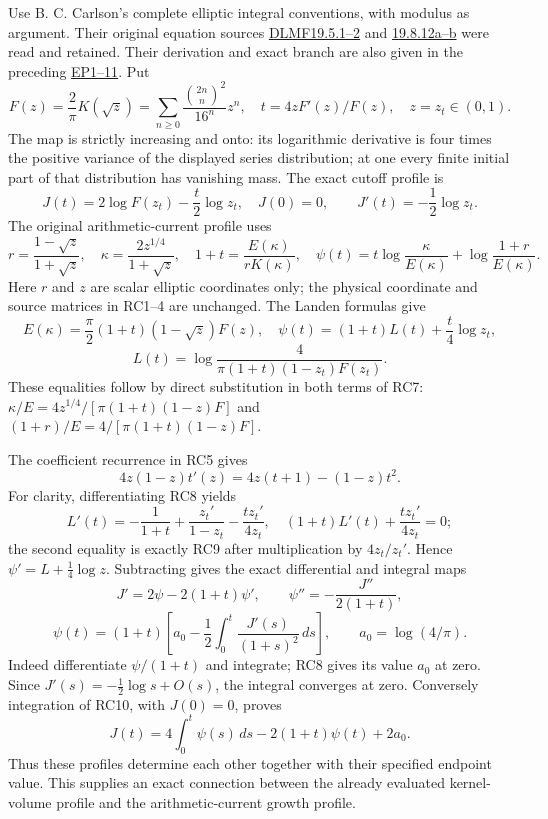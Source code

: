 \documentclass[10pt]{article}
\begin{document}
Use B. C. Carlson's complete elliptic integral conventions, with modulus as argument. Their original equation sources \href{https://dlmf.nist.gov/19.5}{DLMF19.5.1--2} and \href{https://dlmf.nist.gov/19.8.E12}{19.8.12a--b} were read and retained. Their derivation and exact branch are also given in the preceding \href{https://github.com/KokunoYumeto/zeta-function-research-reader/blob/6cf5b3aa8ff395eba6b5512b28d117334da5767b/workbenches/splitzero-tandem/continuations/20260922-cutoff-profile/ELLIPTIC_PROFILE_PROOF.md\#L5}{EP1--11}. Put \[
F(z)=\frac2\pi K(\sqrt z)=\sum_{n\ge0}\frac{\binom{2n}{n}^2}{16^n}z^n,
\quad t=4zF'(z)/F(z),\quad z=z_t\in(0,1).
\tag{RC5}
\] The map is strictly increasing and onto: its logarithmic derivative is four times the positive variance of the displayed series distribution; at one every finite initial part of that distribution has vanishing mass. The exact cutoff profile is \[
J(t)=2\log F(z_t)-\frac t2\log z_t,\quad J(0)=0,
\qquad J'(t)=-\frac12\log z_t.
\tag{RC6}
\] The original arithmetic-current profile uses \[
r=\frac{1-\sqrt z}{1+\sqrt z},\quad
\kappa=\frac{2z^{1/4}}{1+\sqrt z},\quad
1+t=\frac{E(\kappa)}{rK(\kappa)},\quad
\psi(t)=t\log\frac{\kappa}{E(\kappa)}+
\log\frac{1+r}{E(\kappa)}.
\tag{RC7}
\] Here \(r\) and \(z\) are scalar elliptic coordinates only; the physical coordinate and source matrices in RC1--4 are unchanged. The Landen formulas give \[
E(\kappa)=\frac\pi2(1+t)(1-\sqrt z)F(z),
\quad
\psi(t)=(1+t)L(t)+\frac t4\log z_t,
\] \[
L(t)=\log\frac4{\pi(1+t)(1-z_t)F(z_t)}.
\tag{RC8}
\] These equalities follow by direct substitution in both terms of RC7: \(\kappa/E=4z^{1/4}/[\pi(1+t)(1-z)F]\) and \((1+r)/E=4/[\pi(1+t)(1-z)F]\).

The coefficient recurrence in RC5 gives \[
4z(1-z)t'(z)=4z(t+1)-(1-z)t^2.
\tag{RC9}
\] For clarity, differentiating RC8 yields \[
L'(t)=-\frac1{1+t}+\frac{z_t'}{1-z_t}
-\frac{t z_t'}{4z_t},
\quad (1+t)L'(t)+\frac{t z_t'}{4z_t}=0;
\] the second equality is exactly RC9 after multiplication by \(4z_t/z_t'\). Hence \(\psi'=L+\tfrac14\log z\). Subtracting gives the exact differential and integral maps \[
\boxed{J'=2\psi-2(1+t)\psi',\qquad
\psi''=-\frac{J''}{2(1+t)},}
\tag{RC10}
\] \[
\boxed{\psi(t)=(1+t)\left[
a_0-\frac12\int_0^t\frac{J'(s)}{(1+s)^2}\,ds\right],
\qquad a_0=\log(4/\pi).}
\tag{RC11}
\] Indeed differentiate \(\psi/(1+t)\) and integrate; RC8 gives its value \(a_0\) at zero. Since \(J'(s)=-\tfrac12\log s+O(s)\), the integral converges at zero. Conversely integration of RC10, with \(J(0)=0\), proves \[
J(t)=4\int_0^t\psi(s)\,ds-2(1+t)\psi(t)+2a_0.
\tag{RC12}
\] Thus these profiles determine each other together with their specified endpoint value. This supplies an exact connection between the already evaluated kernel-volume profile and the arithmetic-current growth profile.
\end{document}
